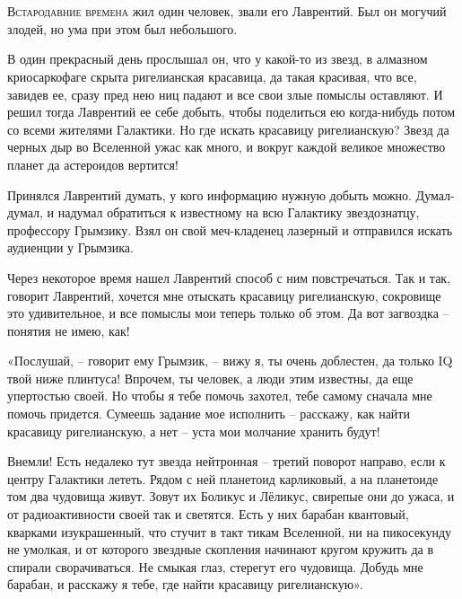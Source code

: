 \documentclass[ebook,oneside,final,openright]{memoir}
\begin{document}
\chapter{}
 \lettrine{В}{стародавние времена} жил один человек, звали его Лаврентий. Был он могучий злодей, но ума при этом был небольшого.\par
\par
В один прекрасный день прослышал он, что у какой-то из звезд, в алмазном криосаркофаге скрыта ригелианская красавица, да такая красивая, что все, завидев ее, сразу пред нею ниц падают и все свои злые помыслы оставляют. И решил тогда Лаврентий ее себе добыть, чтобы поделиться ею когда-нибудь потом со всеми жителями Галактики. Но где искать красавицу ригелианскую? Звезд да черных дыр во Вселенной ужас как много, и вокруг каждой великое множество планет да астероидов вертится!\par
\par
Принялся Лаврентий думать, у кого информацию нужную добыть можно. Думал-думал, и надумал обратиться к известному на всю Галактику звездознатцу, профессору Грымзику. Взял он свой меч-кладенец лазерный и отправился искать аудиенции у Грымзика.\par
\par
Через некоторое время нашел Лаврентий способ с ним повстречаться. Так и так, говорит Лаврентий, хочется мне отыскать красавицу ригелианскую, сокровище это удивительное, и все помыслы мои теперь только об этом. Да вот загвоздка – понятия не имею, как!\par
\par
«Послушай, – говорит ему Грымзик, – вижу я, ты очень доблестен, да только IQ твой ниже плинтуса! Впрочем, ты человек, а люди этим известны, да еще упертостью своей. Но чтобы я тебе помочь захотел, тебе самому сначала мне помочь придется. Сумеешь задание мое исполнить – расскажу, как найти красавицу ригелианскую, а нет – уста мои молчание хранить будут!\par
\par
Внемли! Есть недалеко тут звезда нейтронная – третий поворот направо, если к центру Галактики лететь. Рядом с ней планетоид карликовый, а на планетоиде том два чудовища живут. Зовут их Боликус и Лёликус, свирепые они до ужаса, и от радиоактивности своей так и светятся. Есть у них барабан квантовый, кварками изукрашенный, что стучит в такт тикам Вселенной, ни на пикосекунду не умолкая, и от которого звездные скопления начинают кругом кружить да в спирали сворачиваться. Не смыкая глаз, стерегут его чудовища. Добудь мне барабан, и расскажу я тебе, где найти красавицу ригелианскую».\par
\end{document}
